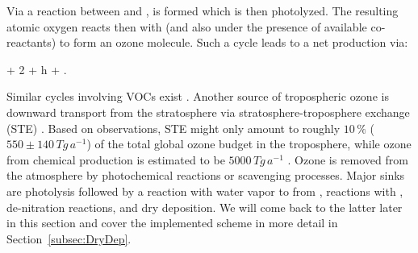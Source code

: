 \documentclass[gmd, manuscript]{copernicus}
\begin{document}
Via a reaction between  and ,  is formed which is then photolyzed. The resulting atomic oxygen reacts then with  (and also under the presence of available co-reactants) to form an ozone molecule.
Such a cycle leads to a net production via:
\begin{reaction}
   + 2 + h\nu \rightarrow {} + .
\end{reaction}
Similar cycles involving VOCs exist \citep{ACP:Monks2015}. Another source of tropospheric ozone is downward transport from the stratosphere via stratosphere-troposphere exchange (STE) \citep{WMO2014}. Based on observations, STE might only amount to roughly $10\,\unit{\%}$ ($550 \pm 140\,\unit{Tg\,a^{-1}}$) of the total global ozone budget in the troposphere, while ozone from chemical production is estimated to be $5000\,\unit{Tg\,a^{-1}}$ \citep{ACP:Monks2015}. Ozone is removed from the atmosphere by photochemical reactions or scavenging processes. Major sinks are photolysis followed by a reaction with water vapor to from ,
reactions with ,
de-nitration reactions,
and dry deposition. We will come back to the latter later in this section and cover the implemented scheme in more detail in Section~\ref{subsec:DryDep}.
\end{document}
